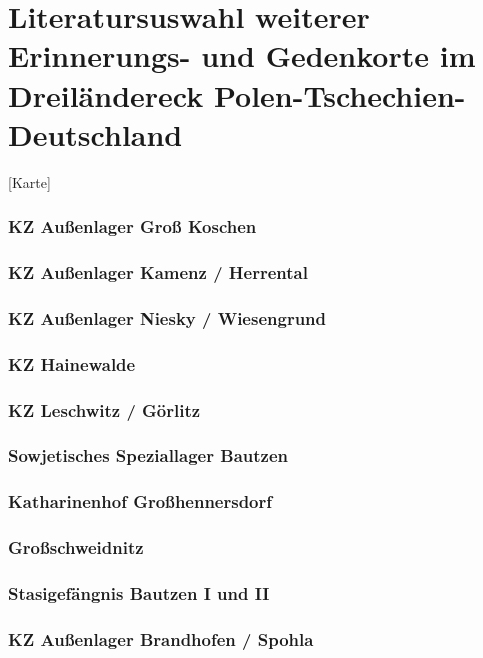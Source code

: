 \chapter{Literatursuswahl weiterer Erinnerungs- und Gedenkorte im Dreiländereck Polen-Tschechien-Deutschland}					

[Karte]

\subsection{KZ Außenlager Groß Koschen}

\subsection{KZ Außenlager Kamenz / Herrental}

\subsection{KZ Außenlager Niesky / Wiesengrund}

\subsection{KZ Hainewalde}

\subsection{KZ Leschwitz / Görlitz}

\subsection{Sowjetisches Speziallager Bautzen}

\subsection{Katharinenhof Großhennersdorf}

\subsection{Großschweidnitz}

\subsection{Stasigefängnis Bautzen I und II}

\subsection{KZ Außenlager Brandhofen / Spohla}

